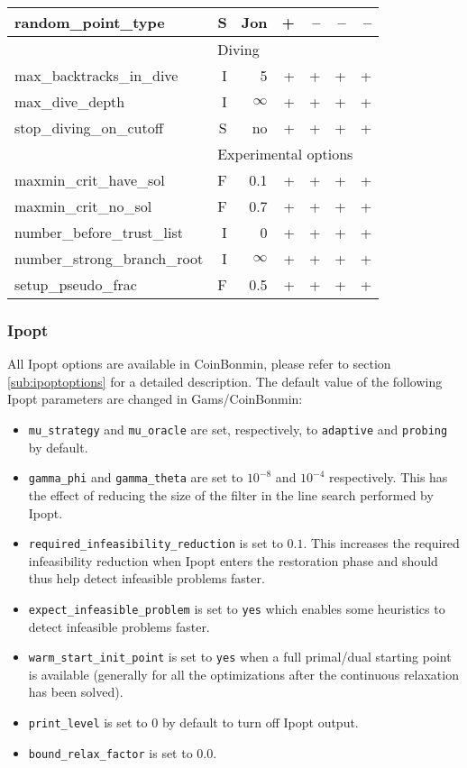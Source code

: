 \begin{center}
\begin{tabular}{|l|r|r|r|r|r|r|}
random\_point\_type& S& Jon& +& --& --& --\\
\hline
\multicolumn{1}{|c}{} & \multicolumn{6}{l|}{Diving}\\
\hline
max\_backtracks\_in\_dive& I& 5& +& +& +& +\\
max\_dive\_depth& I& $\infty$& +& +& +& +\\
stop\_diving\_on\_cutoff& S& no& +& +& +& +\\
\hline
\multicolumn{1}{|c}{} & \multicolumn{6}{l|}{Experimental options}\\
\hline
maxmin\_crit\_have\_sol& F& 0.1& +& +& +& +\\
maxmin\_crit\_no\_sol& F& 0.7& +& +& +& +\\
number\_before\_trust\_list& I& 0& +& +& +& +\\
number\_strong\_branch\_root& I& $\infty$& +& +& +& +\\
setup\_pseudo\_frac& F& 0.5& +& +& +& +\\
\hline
\end{tabular}
\end{center}



\subsubsection{Ipopt}
All Ipopt options are available in CoinBonmin, please refer to section \ref{sub:ipoptoptions} for a detailed description.
The default value of the following Ipopt parameters are changed in Gams/CoinBonmin:
\begin{itemize}
\item \texttt{mu\_strategy} and \texttt{mu\_oracle} are set, respectively, to {\tt adaptive} and {\tt probing} by default.
\item \texttt{gamma\_phi} and \texttt{gamma\_theta} are set to $10^{-8}$ and $10^{-4}$ respectively. This has the effect of reducing the size of the filter in the line search performed by Ipopt.
\item \texttt{required\_infeasibility\_reduction} is set to $0.1$.
This increases the required infeasibility reduction when Ipopt enters the restoration phase and should thus help
detect infeasible problems faster.
\item \texttt{expect\_infeasible\_problem} is set to {\tt yes} which enables some heuristics to detect infeasible problems faster.
\item \texttt{warm\_start\_init\_point} is set to {\tt yes} when a full primal/dual starting point is available (generally for all the optimizations after the continuous relaxation has been solved).
\item \texttt{print\_level} is set to $0$ by default to turn off Ipopt output.
\item \texttt{bound\_relax\_factor} is set to $0.0$.
\end{itemize}

